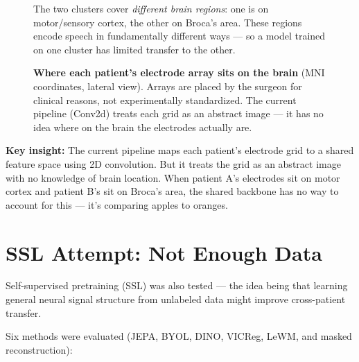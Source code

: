 \documentclass[11pt]{article}
\begin{document}
\begin{figure}[ht]
\begin{minipage}[b]{0.42\textwidth}
\vspace{0.5em}
\footnotesize
The two clusters cover \textit{different brain regions}: one is on motor/sensory cortex, the other on Broca's area. These regions encode speech in fundamentally different ways --- so a model trained on one cluster has limited transfer to the other.
\end{minipage}
\caption{\textbf{Where each patient's electrode array sits on the brain} (MNI coordinates, lateral view). Arrays are placed by the surgeon for clinical reasons, not experimentally standardized. The current pipeline (Conv2d) treats each grid as an abstract image --- it has no idea where on the brain the electrodes actually are.}
\label{fig:overlap}
\end{figure}

\textbf{Key insight:} The current pipeline maps each patient's electrode grid to a shared feature space using 2D convolution. But it treats the grid as an abstract image with no knowledge of brain location. When patient A's electrodes sit on motor cortex and patient B's sit on Broca's area, the shared backbone has no way to account for this --- it's comparing apples to oranges.

\section{SSL Attempt: Not Enough Data}

Self-supervised pretraining (SSL) was also tested --- the idea being that learning general neural signal structure from unlabeled data might improve cross-patient transfer.

Six methods were evaluated (JEPA, BYOL, DINO, VICReg, LeWM, and masked reconstruction):
\end{document}
